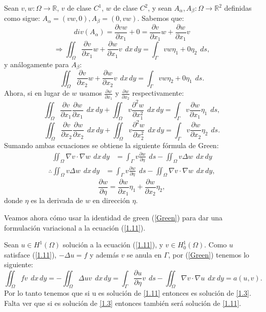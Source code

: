 \documentclass[12pt,spanish,oneside]{book}
\theoremstyle{plain}
\numberwithin{equation}{chapter}
\theoremstyle{definition}
\theoremstyle{remark}
\newcommand{\re}{\mathbb{R}}
\newcommand{\parc}[2]{\frac{\partial #1}{\partial #2}}
\newcommand{\hu}{H^1}
\newcommand{\hcu}{H_0^1}
\newcommand{\dxy}{\hspace{5pt} dx\hspace{2pt} dy }
\newcommand{\ds}{\hspace{5pt} ds}
\begin{document}
Sean $v,w:\Omega \rightarrow \re$, $v$ de clase $ C^1$, $w$ de clase $ C^2$, y sean $A_\alpha,A_\beta:\Omega\rightarrow \re^2$ definidas como sigue: $ A_\alpha=(vw,0),A_\beta=(0,vw) $. 
Sabemos que: 
\[ div(A_\alpha)= \frac{\partial v w }{\partial x_1}+0= \frac{\partial v }{\partial x_1}w+ \frac{\partial w }{\partial x_1}v\]
\[ \Rightarrow\iint_\Omega \frac{\partial v }{\partial x_1}w+ \frac{\partial w }{\partial x_1}v\dxy =\int_\Gamma vw \eta_1+0\eta_2 \ds, \]
y análogamente para $A_\beta$:
\[\iint_\Omega \frac{\partial v }{\partial x_2}w+ \frac{\partial w }{\partial x_2}v \dxy =\int_\Gamma vw\eta_2+0\eta_1 \ds. \]
Ahora, si en lugar de $w$ usamos $\frac{\partial w }{\partial x_1}$ y $\frac{\partial w }{\partial x_2}$ respectivamente: 
\[\iint_\Omega \frac{\partial v}{\partial x_1} \frac{\partial w}{\partial x_1} \dxy + \iint_\Omega v \frac{\partial^2 w }{\partial x_1^2} \dxy = \int_\Gamma v \frac{\partial w}{\partial x_1}\eta_1 \ds, \]
\[\iint_\Omega \frac{\partial v}{\partial x_2} \frac{\partial w}{\partial x_2} \dxy+ \iint_\Omega v \frac{\partial^2 w }{\partial x_2^2} \dxy = \int_\Gamma v \frac{\partial w}{\partial x_2}\eta_2 \ds. \]
Sumando ambas ecuaciones se obtiene la siguiente fórmula de Green: 
\begin{align*}
\iint_\Omega \nabla v \cdot \nabla w \dxy &= \int_\Gamma v\frac{\partial w }{\partial \eta} \ds - \iint_\Omega v \Delta w \dxy
\end{align*}
\begin{align}
\therefore
 \iint_\Omega v \Delta w \dxy & = \int_\Gamma v\frac{\partial w }{\partial \eta} \ds -\iint_\Omega \nabla v \cdot \nabla w \dxy,\label{Green}
\end{align}
\[\frac{\partial w}{\partial \eta}=\frac{\partial w}{\partial x_1} \eta_1+\frac{\partial w}{\partial x_2} \eta_2,\]
donde $\eta$ es la derivada de $w$ en dirección $\eta$.

Veamos ahora cómo usar la identidad de green (\ref{Green}) para dar una formulación variacional a la ecuación (\ref{1.11}).

Sean $u\in \hu(\Omega)$ solución a la ecuación (\ref{1.11}), y $v\in\hcu(\Omega)$. Como $u$ satisface (\ref{1.11}), $-\Delta u=f$ y además $v$ se anula en $\Gamma$, por (\ref{Green}) tenemos lo siguiente:
\[\iint_\Omega f v \dxy = - \iint_\Omega \Delta u v \dxy = \int_\Gamma \parc{u}{\eta}v \ds-\iint_\Omega \nabla v\cdot \nabla u \dxy=a(u,v).\]
Por lo tanto tenemos que si u es solución de \ref{1.11} entonces es solución de \ref{1.3}. Falta ver que si es solución de \ref{1.3} entonces también será solución de \ref{1.11}.
\end{document}
